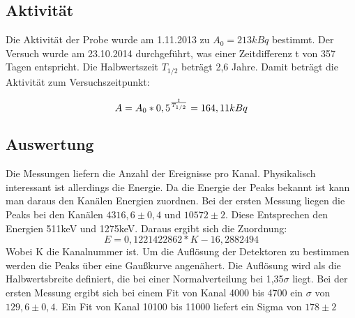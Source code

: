 \documentclass[a4paper,11pt,twoside]{article}
\begin{document}
\subsection{Aktivität}
Die Aktivität der Probe wurde am 1.11.2013 zu $A_0=213 kBq$ bestimmt. Der Versuch wurde am 23.10.2014 durchgeführt, was einer Zeitdifferenz t von 357 Tagen entspricht. Die Halbwertszeit $T_{1/2}$ beträgt 2,6 Jahre. Damit beträgt die Aktivität zum Versuchszeitpunkt:

\begin{equation}
A=A_0*0,5^{t\over T_{1/2}}=164,11 kBq
\end{equation}

\subsection{Auswertung}
Die Messungen liefern die Anzahl der Ereignisse pro Kanal. Physikalisch interessant ist allerdings die Energie. Da die Energie der Peaks bekannt ist kann man daraus den Kanälen Energien zuordnen. Bei der ersten Messung liegen die Peaks bei den Kanälen $4316,6\pm0,4$ und $10572\pm2$. Diese Entsprechen den Energien 511keV und 1275keV. Daraus ergibt sich die Zuordnung:
\begin{equation}
E=0,1221422862*K-16,2882494
\end{equation}
Wobei K die Kanalnummer ist.
Um die Auflösung der Detektoren zu bestimmen werden die Peaks über eine Gaußkurve angenähert. Die Auflösung wird als die Halbwertsbreite definiert, die bei einer Normalverteilung bei 1,35$\sigma$ liegt. Bei der ersten Messung ergibt sich bei einem Fit von Kanal 4000 bis 4700 ein $\sigma$ von $129,6\pm0,4$. Ein Fit von Kanal 10100 bis 11000 liefert ein Sigma von $178\pm2$



%
%
%
%
%
\end{document}
